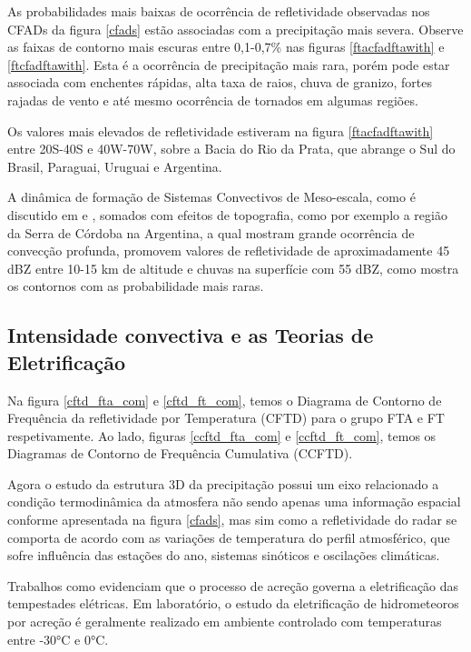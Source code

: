 As probabilidades mais baixas de ocorrência de refletividade observadas nos CFADs da figura \ref{cfads} estão associadas com a precipitação mais severa. Observe as faixas de contorno mais escuras entre 0,1-0,7\% nas figuras \ref{ftacfadftawith} e \ref{ftcfadftawith}. Esta é a ocorrência de precipitação mais rara, porém pode estar associada com enchentes rápidas, alta taxa de raios, chuva de granizo, fortes rajadas de vento e até mesmo ocorrência de tornados em algumas regiões. 

Os valores mais elevados de refletividade estiveram na figura \ref{ftacfadftawith} entre 20S-40S e 40W-70W, sobre a Bacia do Rio da Prata, que abrange o Sul do Brasil, Paraguai, Uruguai e Argentina. 

A dinâmica de formação de Sistemas Convectivos de Meso-escala, como é discutido em \cite{Velasco1987} e \cite{Durkee2009}, somados com efeitos de topografia, como por exemplo a região da Serra de Córdoba na Argentina, a qual \cite{Rasmussen2011} mostram grande ocorrência de convecção profunda, promovem valores de refletividade de aproximadamente 45 dBZ entre 10-15 km de altitude e chuvas na superfície com 55 dBZ, como mostra os contornos com as probabilidade mais raras.


\subsection{Intensidade convectiva e as Teorias de Eletrificação}

Na figura \ref{cftd_fta_com} e \ref{cftd_ft_com}, temos o Diagrama de Contorno de Frequência da refletividade por Temperatura (CFTD) para o grupo FTA e FT respetivamente. Ao lado, figuras \ref{ccftd_fta_com} e \ref{ccftd_ft_com}, temos os Diagramas de Contorno de Frequência  Cumulativa (CCFTD). 



Agora o estudo da estrutura 3D da precipitação possui um eixo relacionado a condição termodinâmica da atmosfera não sendo apenas uma informação espacial conforme apresentada na figura \ref{cfads}, mas sim como a refletividade do radar se comporta de acordo com as variações de temperatura do perfil atmosférico, que sofre influência das estações do ano, sistemas sinóticos e oscilações climáticas.   

Trabalhos como \cite{Takahashi1978,Saunders1999}  evidenciam que o processo de acreção governa a eletrificação das tempestades elétricas. Em laboratório, o estudo da eletrificação de hidrometeoros por acreção é geralmente realizado em ambiente controlado com temperaturas entre -30°C e 0°C.


